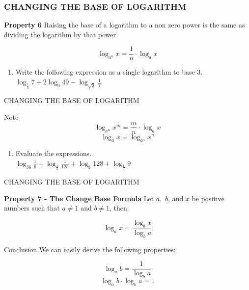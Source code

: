 \documentclass[xcolor=dvipsnames]{beamer}
\begin{document}
\begin{frame}
\frametitle{ CHANGING THE BASE OF LOGARITHM }
\begin{block}{\textbf{Property 6} }
Raising the base of a logarithm to a non zero power is the same as dividing the logarithm by that power

$$  \log_{a^{n}}x = \frac{1}{n} \cdot \log_{a}x   $$
   
 \end{block}
 \begin{exampleblock}

\begin{enumerate}
    \item Write the following expression as a single logarithm to base 3.\\
    $\log_{\frac{1}{3}}7 + 2 \log_{9}49  -\log_{\sqrt{3}}\frac{1}{7}$
   
\end{enumerate}
   \end{exampleblock}
\end{frame}
\begin{frame}{CHANGING THE BASE OF LOGARITHM}
    \begin{alertblock}{Note}
    $$  \log_{a^{n}}x^{m} = \frac{m}{n} \cdot \log_{a}x   $$
    $$  \log_{a }x  =    \log_{a^{n}}x^{n}  $$
    \end{alertblock}
     \begin{exampleblock}

\begin{enumerate}
    \item Evaluate the expressions.\\
    $\log_{36}\frac{1}{6} +  \log_{\frac{1}{5}}\frac{1}{125}  +\log_{8}128 +  \log_{\frac{1}{3}}9 $
   
\end{enumerate}
   \end{exampleblock}
  
\end{frame}
\begin{frame}{CHANGING THE BASE OF LOGARITHM}
   \begin{block}{\textbf{Property 7 - \textbf{The Change Base Formula}} }
Let $a,$ $b$, and $x$ be positive numbers such that $a\ne 1$ and $b\ne 1$, then:


$$  \log_{a}x = \frac{   \log_{b}x}{ \log_{b}a}   $$
   
 \end{block}
  \begin{block}{ Conclusion }
We can easily derive the following properties:
 


$$  \log_{a}b = \frac{1}{ \log_{b}a}   $$
$$  \log_{a}b \cdot  \log_{b}a =1   $$
   
 \end{block}
\end{frame} 
\end{document}
